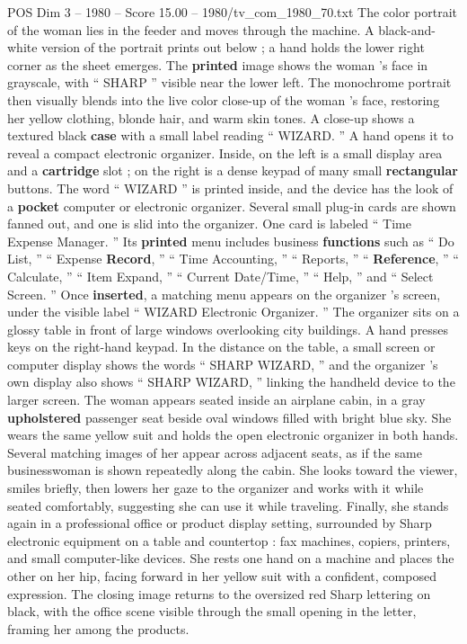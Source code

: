 \begin{textsample}{POS Dim 3 – 1980 – Score 15.00 – 1980/tv\_com\_1980\_70.txt}
The color portrait of the woman lies in the feeder and moves through the machine.
A black-and-white version of the portrait prints out below ; a hand holds the lower right corner as the sheet emerges.
The \textbf{printed} image shows the woman ’s face in grayscale, with “ SHARP ” visible near the lower left.
The monochrome portrait then visually blends into the live color close-up of the woman ’s face, restoring her yellow clothing, blonde hair, and warm skin tones.
A close-up shows a textured black \textbf{case} with a small label reading “ WIZARD. ” A hand opens it to reveal a compact electronic organizer.
Inside, on the left is a small display area and a \textbf{cartridge} slot ; on the right is a dense keypad of many small \textbf{rectangular} buttons.
The word “ WIZARD ” is printed inside, and the device has the look of a \textbf{pocket} computer or electronic organizer.
Several small plug-in cards are shown fanned out, and one is slid into the organizer.
One card is labeled “ Time Expense Manager. ” Its \textbf{printed} menu includes business \textbf{functions} such as “ Do List, ” “ Expense \textbf{Record}, ” “ Time Accounting, ” “ Reports, ” “ \textbf{Reference}, ” “ Calculate, ” “ Item Expand, ” “ Current Date/Time, ” “ Help, ” and “ Select Screen. ” Once \textbf{inserted}, a matching menu appears on the organizer ’s screen, under the visible label “ WIZARD Electronic Organizer. ” The organizer sits on a glossy table in front of large windows overlooking city buildings.
A hand presses keys on the right-hand keypad.
In the distance on the table, a small screen or computer display shows the words “ SHARP WIZARD, ” and the organizer ’s own display also shows “ SHARP WIZARD, ” linking the handheld device to the larger screen.
The woman appears seated inside an airplane cabin, in a gray \textbf{upholstered} passenger seat beside oval windows filled with bright blue sky.
She wears the same yellow suit and holds the open electronic organizer in both hands.
Several matching images of her appear across adjacent seats, as if the same businesswoman is shown repeatedly along the cabin.
She looks toward the viewer, smiles briefly, then lowers her gaze to the organizer and works with it while seated comfortably, suggesting she can use it while traveling.
Finally, she stands again in a professional office or product display setting, surrounded by Sharp electronic equipment on a table and countertop : fax machines, copiers, printers, and small computer-like devices.
She rests one hand on a machine and places the other on her hip, facing forward in her yellow suit with a confident, composed expression.
The closing image returns to the oversized red Sharp lettering on black, with the office scene visible through the small opening in the letter, framing her among the products.

\end{textsample}

